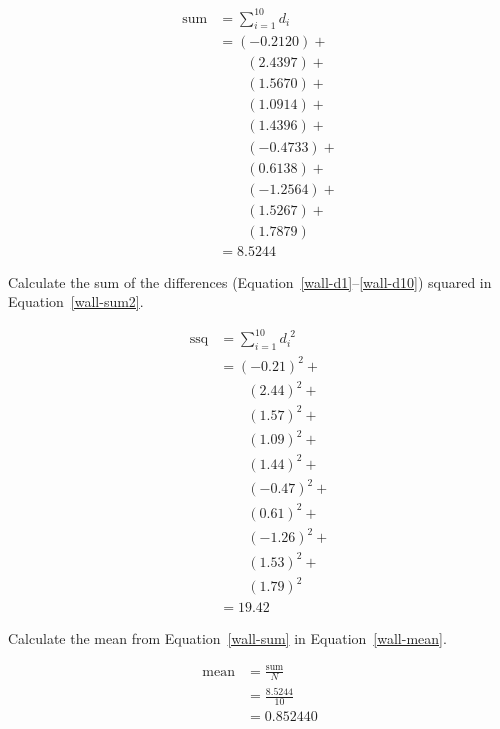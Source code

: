 \documentclass[twocolumn]{article}
\begin{document}
\begin{align}
\text{sum} &= \sum_{i=1}^{10} d_{i} \nonumber\\
 &= (-0.2120) + \nonumber\\
 &\quad\quad (2.4397) + \nonumber\\
 &\quad\quad (1.5670) + \nonumber\\
 &\quad\quad (1.0914) + \nonumber\\
 &\quad\quad (1.4396) + \nonumber\\
 &\quad\quad (-0.4733) + \nonumber\\
 &\quad\quad (0.6138) + \nonumber\\
 &\quad\quad (-1.2564) + \nonumber\\
 &\quad\quad (1.5267) + \nonumber\\
 &\quad\quad (1.7879) \nonumber\\
 &= 8.5244 \label{wall-sum}
\end{align}

Calculate the sum of the differences (Equation~\ref{wall-d1}--\ref{wall-d10}) squared in Equation~\ref{wall-sum2}.

\begin{align}
\text{ssq} &= \sum_{i=1}^{10} d_{i}^{\phantom{i}2} \nonumber\\
 &= (-0.21)^2 + \nonumber\\
 &\quad\quad (2.44)^2 + \nonumber\\
 &\quad\quad (1.57)^2 + \nonumber\\
 &\quad\quad (1.09)^2 + \nonumber\\
 &\quad\quad (1.44)^2 + \nonumber\\
 &\quad\quad (-0.47)^2 + \nonumber\\
 &\quad\quad (0.61)^2 + \nonumber\\
 &\quad\quad (-1.26)^2 + \nonumber\\
 &\quad\quad (1.53)^2 + \nonumber\\
 &\quad\quad (1.79)^2 \nonumber\\
 &= 19.42 \label{wall-sum2}
\end{align}

Calculate the mean from Equation~\ref{wall-sum} in Equation~\ref{wall-mean}.

\begin{align}
\text{mean} &= \frac{\text{sum}}{N} \nonumber\\
 &= \frac{8.5244}{10} \nonumber\\
 &= 0.852440 \label{wall-mean}
\end{align}
\end{document}
